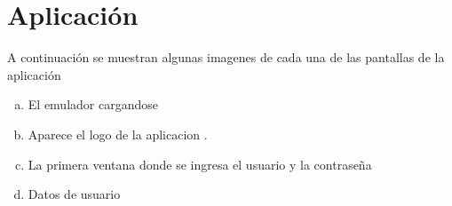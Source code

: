 \begin{figure}[ht!]
 
   \centering
   \hspace{0.1\linewidth}
  
\end{figure}

 
\section{ Aplicación}
A continuación se muestran algunas imagenes de  cada una de las pantallas de la aplicación
\begin{enumerate}[a)]
     \item  El emulador cargandose
     \item Aparece el logo de la aplicacion .
     \item La primera ventana donde se ingresa el usuario y la contraseña
    \item Datos de usuario
    

\end{enumerate}

